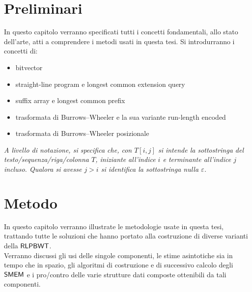 \documentclass[a4paper,12pt, oneside]{book}
\def\RLPBWT{\mbox{\rm {\sf RLPBWT}}}
\def\SMEM{\mbox{\rm {\sf SMEM}}}
\begin{document}
\chapter{Preliminari}
\label{prechap}
In questo capitolo verranno specificati tutti i concetti fondamentali, allo
stato dell'arte, atti a comprendere i metodi usati in questa tesi.
Si introdurranno i concetti di:
\begin{itemize}
  \item bitvector
  \item straight-line program e longest common extension query
  \item suffix array e longest common prefix
  \item trasformata di Burrows--Wheeler e la sua variante run-length encoded
  \item trasformata di Burrows--Wheeler posizionale
\end{itemize}
\noindent
\textit{A livello di notazione, si specifica che, con
  $T[i,j]$ si intende la sottostringa del testo/sequenza/riga/colonna $T$,
  iniziante all'indice $i$ e terminante all'indice $j$ incluso. Qualora si
  avesse $j>i$ si identifica la sottostringa nulla $\varepsilon$.}

%












\chapter{Metodo}
\label{metchap}
In questo capitolo verranno illustrate le metodologie usate in questa tesi,
trattando tutte le soluzioni
che hanno portato alla costruzione di diverse varianti della $\RLPBWT$.\\
Verranno discussi gli usi delle singole componenti, le stime asintotiche sia in
tempo che in spazio, gli algoritmi di costruzione e di successivo calcolo degli
$\SMEM$ e i pro/contro delle varie strutture dati composte
ottenibili da tali componenti.









\end{document}
